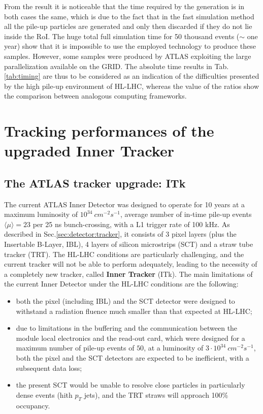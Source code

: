 \documentclass[a4paper,twoside,12pt]{book}
\begin{document}
From the result it is noticeable that the time required by the generation is in both cases
the same, which is due to the fact that in the fast simulation method all the pile-up particles
are generated and only then discarded if they do not lie inside the RoI. The huge total full
simulation time for 50 thousand events ($\sim$ one year) show that it is impossible to use
the employed technology to produce these samples. However, some samples were
produced by ATLAS exploiting the large parallelization available on the GRID. The absolute time results in Tab.\ref{tab:timing} are thus to be
considered as an indication of the difficulties presented by the high pile-up environment of
HL-LHC, whereas the value of the ratios show the comparison between analogous computing
frameworks. 

\clearpage

\chapter{Tracking performances of the upgraded Inner Tracker}\label{sec:tracking}

\section{The ATLAS tracker upgrade: ITk}
The current ATLAS Inner Detector was designed to operate for 10 years at a maximum luminosity of $10^{34}\ cm^{-2} s^{-1}$, 
average number of in-time pile-up events $\langle\mu\rangle = 23$ per 25 ns bunch-crossing, with a L1 trigger rate of 100 kHz\cite{loi}. As described in Sec.\ref{sec:detector:tracker}, it consists of 3 pixel layers (plus the Insertable B-Layer, IBL), 4 layers of silicon microstrips (SCT)
and a straw tube tracker (TRT). The HL-LHC conditions are particularly challenging, and the current tracker will not be able to perform adequately, leading to the necessity of a completely new tracker, called \textbf{Inner Tracker} (ITk). The main limitations of the current Inner Detector under the HL-LHC conditions are the following:

\begin{itemize}
\item both the pixel (including IBL) and the SCT detector were designed to withstand a radiation fluence much smaller
than that expected at HL-LHC;
\item due to limitations in the buffering and the communication between the module local electronics and the read-out card, which
were designed for a maximum number of pile-up events of $50$,
at a luminosity of $3 \cdot 10^{34}\ cm^{-2}s^{-1}$, both the pixel and the SCT detectors are expected to be inefficient, with
a subsequent data loss;
\item the present SCT would be unable to resolve close particles in particularly dense events (hith $p_{T}$ jets), and the TRT straws
	will approach 100\% occupancy.
\end{itemize}
\end{document}
